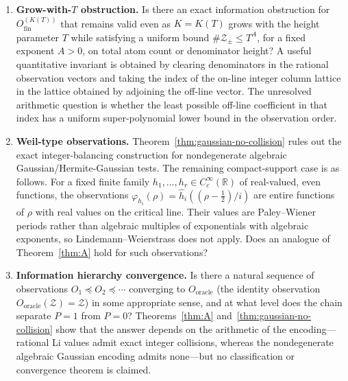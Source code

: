 \documentclass[12pt]{amsart}
\theoremstyle{definition}
\theoremstyle{remark}
\theoremstyle{plain}
\newcommand{\Ofinite}{O_{\mathrm{fin}}}
\newcommand{\RR}{\mathbb{R}}
\begin{document}
\begin{enumerate}
\item \textbf{Grow-with-$T$ obstruction.}  Is there an exact
  information obstruction for $\Ofinite^{(K(T))}$ that remains valid even
  as $K = K(T)$ grows with the height parameter $T$ while satisfying a
  uniform bound $\#\mathcal{Z}_\pm \leq T^A$, for a fixed exponent $A>0$,
  on total atom count or denominator height?
  A useful quantitative invariant is obtained by clearing denominators in the
  rational observation vectors and taking the index of the on-line integer
  column lattice in the lattice obtained by adjoining the off-line vector.
  The unresolved arithmetic question is whether the least possible off-line
  coefficient in that index has a uniform super-polynomial lower bound in the
  observation order.

\item \textbf{Weil-type observations.}
  Theorem~\ref{thm:gaussian-no-collision} rules out the exact
  integer-balancing construction for nondegenerate algebraic
  Gaussian/Hermite-Gaussian tests.  The remaining compact-support case is as
  follows.  For a fixed finite family
  $h_1, \ldots, h_r \in C_c^\infty(\RR)$ of
  real-valued, even functions, the observations
  $\varphi_{h_i}(\rho) = \hat{h}_i((\rho-\tfrac12)/i)$ are entire functions
  of $\rho$ with real values on the critical line.
  Their values are Paley--Wiener periods rather than algebraic multiples of
  exponentials with algebraic exponents, so Lindemann--Weierstrass does not
  apply.  Does an analogue of Theorem~\ref{thm:A} hold for such observations?

\item \textbf{Information hierarchy convergence.}
  Is there a natural sequence of observations
  $O_1 \preceq O_2 \preceq \cdots$ converging to $O_{\mathrm{oracle}}$
  (the identity observation $O_{\mathrm{oracle}}(\mathcal{Z})=\mathcal{Z}$)
  in some appropriate sense, and at what level does the chain separate
  $P = 1$ from $P = 0$?
  Theorems~\ref{thm:A} and~\ref{thm:gaussian-no-collision} show that the
  answer depends on the arithmetic of the encoding---rational Li values admit
  exact integer collisions, whereas the nondegenerate algebraic Gaussian
  encoding admits none---but no classification or convergence theorem is
  claimed.
\end{enumerate}
\end{document}
